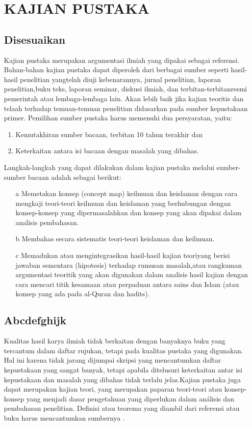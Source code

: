 \chapter{KAJIAN PUSTAKA}
\section{Disesuaikan}
Kajian pustaka merupakan argumentasi ilmiah yang dipakai sebagai referensi. Bahan-bahan kajian pustaka dapat diperoleh dari berbagai sumber seperti hasil-hasil penelitian yangtelah diuji kebenarannya, jurnal penelitian, laporan penelitian,buku teks, laporan seminar, diskusi ilmiah, dan terbitan-terbitanresmi pemerintah atau lembaga-lembaga lain. Akan lebih baik jika kajian teoritis dan telaah terhadap temuan-temuan penelitian didasarkan pada sumber kepustakaan primer. Pemilihan sumber pustaka harus memenuhi dua persyaratan, yaitu:
\begin{enumerate}
\item Kemutakhiran sumber bacaan, terbitan 10 tahun terakhir dan
\item Keterkaitan antara isi bacaan dengan masalah yang dibahas.
\end{enumerate}

Langkah-langkah yang dapat dilakukan dalam kajian pustaka melalui sumber-sumber bacaan adalah sebagai berikut:
\begin{itemize}
\item[a] Memetakan konsep (concept map) keilmuan dan keislaman dengan cara mengkaji teori-teori keilmuan dan keislaman yang berhubungan dengan konsep-konsep yang dipermasalahkan dan konsep yang akan dipakai dalam analisis pembahasan.
\item[b] Membahas secara sistematis teori-teori keislaman dan keilmuan.
\item[c] Memadukan atau mengintegrasikan hasil-hasil kajian teoriyang berisi jawaban sementara (hipotesis) terhadap rumusan masalah,atau rangkuman argumentasi teoritik yang akan digunakan dalam analisis hasil kajian dengan cara mencari titik kesamaan atau perpaduan antara sains dan Islam (atau konsep yang ada pada al-Quran dan hadits).
\end{itemize}

\section{Abcdefghijk}
Kualitas hasil karya ilmiah tidak berkaitan dengan banyaknya buku yang tercantum dalam daftar rujukan, tetapi pada kualitas pustaka yang digunakan. Hal ini karena tidak jarang dijumpai skripsi yang mencantumkan daftar kepustakaan yang sangat banyak, tetapi apabila ditelusuri keterkaitan antar isi kepustakaan dan masalah yang dibahas tidak terlalu jelas.Kajian pustaka juga dapat merupakan kajian teori, yang merupakan paparan teori-teori atau konsep-konsep yang menjadi dasar pengetahuan yang diperlukan dalam análisis dan pembahasan penelitian. Definisi atau teorema yang diambil dari referensi atau buku harus mencantumkan sumbernya \cite{Liu}.

